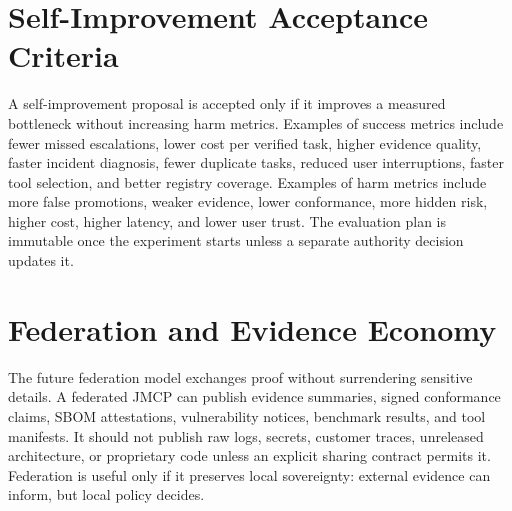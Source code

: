 \documentclass[journal,onecolumn]{IEEEtran}
\begin{document}
\section{Self-Improvement Acceptance Criteria}
A self-improvement proposal is accepted only if it improves a measured bottleneck without increasing harm metrics. Examples of success metrics include fewer missed escalations, lower cost per verified task, higher evidence quality, faster incident diagnosis, fewer duplicate tasks, reduced user interruptions, faster tool selection, and better registry coverage. Examples of harm metrics include more false promotions, weaker evidence, lower conformance, more hidden risk, higher cost, higher latency, and lower user trust. The evaluation plan is immutable once the experiment starts unless a separate authority decision updates it.

\section{Federation and Evidence Economy}
The future federation model exchanges proof without surrendering sensitive details. A federated JMCP can publish evidence summaries, signed conformance claims, SBOM attestations, vulnerability notices, benchmark results, and tool manifests. It should not publish raw logs, secrets, customer traces, unreleased architecture, or proprietary code unless an explicit sharing contract permits it. Federation is useful only if it preserves local sovereignty: external evidence can inform, but local policy decides.
\end{document}
